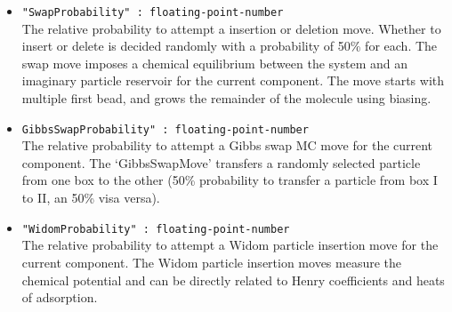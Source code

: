 \begin{itemize}
\item{\verb+"SwapProbability" : floating-point-number+}\\
The relative probability to attempt a insertion or deletion move. 
Whether to insert or delete is decided randomly with a probability of 50\% for each.
The swap move imposes a chemical equilibrium between the system and 
an imaginary particle reservoir for the current component. 
The move starts with multiple first bead, and
grows the remainder of the molecule using biasing.
\item{\verb+GibbsSwapProbability" : floating-point-number+}\\
The relative probability to attempt a Gibbs swap MC move for the current component. 
The `GibbsSwapMove' transfers a randomly selected particle from one box to the other
(50\% probability to transfer a particle from box I to II, an 50\% visa versa).
\item{\verb+"WidomProbability" : floating-point-number+}\\
The relative probability to attempt a Widom particle insertion move for the current component. 
The Widom particle insertion moves measure the chemical potential
and can be directly related to Henry coefficients and heats of adsorption.
\end{itemize}
